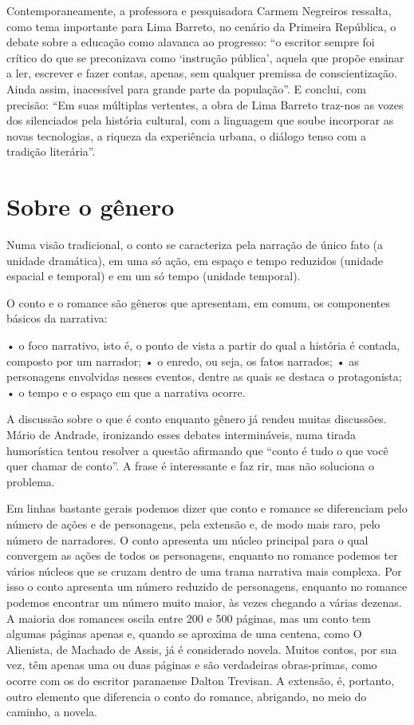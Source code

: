 Contemporaneamente, a professora e pesquisadora Carmem Negreiros
ressalta, como tema importante para Lima Barreto, no cenário da Primeira
República, o debate sobre a educação como alavanca ao progresso: ``o
escritor sempre foi crítico do que se preconizava como `instrução
pública', aquela que propõe ensinar a ler, escrever e fazer contas,
apenas, sem qualquer premissa de conscientização. Ainda assim,
inacessível para grande parte da população''. E conclui, com precisão:
``Em suas múltiplas vertentes, a obra de Lima Barreto traz-nos as vozes
dos silenciados pela história cultural, com a linguagem que soube
incorporar as novas tecnologias, a riqueza da experiência urbana, o
diálogo tenso com a tradição literária''.

\chapter{Sobre o gênero}

Numa visão tradicional, o conto se caracteriza pela narração de único fato (a unidade dramática), em uma só ação, em espaço e tempo reduzidos (unidade espacial e temporal) e em um só tempo (unidade temporal). 

O conto e o romance são gêneros que apresentam, em comum, os componentes básicos da narrativa: 

•	o foco narrativo, isto é, o ponto de vista a partir do qual a história é contada, composto por um narrador;  
•	o enredo, ou seja, os fatos narrados; 
•	as personagens envolvidas nesses eventos, dentre as quais se destaca o protagonista; 
•	o tempo e o espaço em que a narrativa ocorre.   

A discussão sobre o que é conto enquanto gênero já rendeu muitas discussões. Mário de Andrade, ironizando esses debates intermináveis, numa tirada humorística tentou resolver a questão afirmando que “conto é tudo o que você quer chamar de conto”. A frase é interessante e faz rir, mas não soluciona o problema.

Em linhas bastante gerais podemos dizer que conto e romance se diferenciam pelo número de ações e de personagens, pela extensão e, de modo mais raro, pelo número de narradores. O conto apresenta um núcleo principal para o qual convergem as ações de todos os personagens, enquanto no romance podemos ter vários núcleos que se cruzam dentro de uma trama narrativa mais complexa. Por isso o conto apresenta um número reduzido de personagens, enquanto no romance podemos encontrar um número muito maior, às vezes chegando a várias dezenas. A maioria dos romances oscila entre 200 e 500 páginas, mas um conto tem algumas páginas apenas e, quando se aproxima de uma centena, como O Alienista, de Machado de Assis, já é considerado novela. Muitos contos, por sua vez, têm apenas uma ou duas páginas e são verdadeiras obras-primas, como ocorre com os do escritor paranaense Dalton Trevisan. A extensão, é, portanto, outro elemento que diferencia o conto do romance, abrigando, no meio do caminho, a novela.

